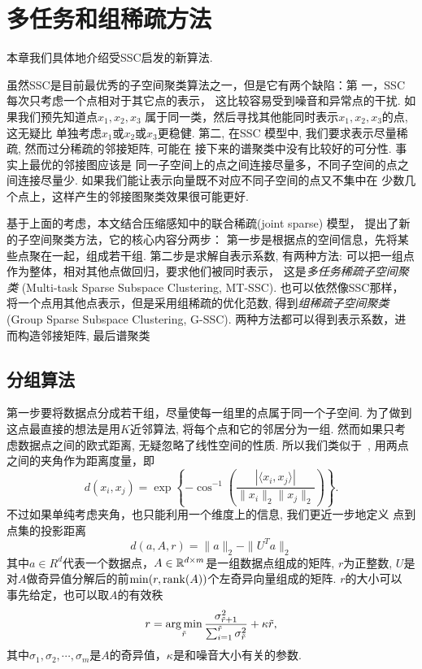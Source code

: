 \chapter{多任务和组稀疏方法}\label{chp:prob_setup}
本章我们具体地介绍受SSC启发的新算法.

虽然SSC是目前最优秀的子空间聚类算法之一，但是它有两个缺陷：第
一，SSC 每次只考虑一个点相对于其它点的表示，
这比较容易受到噪音和异常点的干扰. 如果我们预先知道点\(x_1, x_2, x_3\)
属于同一类，然后寻找其他能同时表示\(x_1, x_2, x_3\)的点, 这无疑比
单独考虑\(x_1\)或\(x_2\)或\(x_3\)更稳健. 第二, 在SSC 模型中,
我们要求表示尽量稀疏, 然而过分稀疏的邻接矩阵, 可能在
接下来的谱聚类中没有比较好的可分性. 事实上最优的邻接图应该是
同一子空间上的点之间连接尽量多，不同子空间的点之间连接尽量少.
如果我们能让表示向量既不对应不同子空间的点又不集中在
少数几个点上，这样产生的邻接图聚类效果很可能更好.

基于上面的考虑，本文结合压缩感知中的联合稀疏(joint sparse) 模型\cite{yuan2012visual}，
提出了新的子空间聚类方法，它的核心内容分两步：
第一步是根据点的空间信息，先将某些点聚在一起，组成若干组.
第二步是求解自表示系数, 有两种方法:
可以把一组点作为整体，相对其他点做回归，要求他们被同时表示，
这是\emph{多任务稀疏子空间聚类}
(Multi-task Sparse Subspace Clustering, MT-SSC). 也可以依然像SSC那样，
将一个点用其他点表示，但是采用组稀疏的优化范数,
得到\emph{组稀疏子空间聚类}(Group Sparse Subspace Clustering, G-SSC).
两种方法都可以得到表示系数，进而构造邻接矩阵, 最后谱聚类

\section{分组算法} 
第一步要将数据点分成若干组，尽量使每一组里的点属于同一个子空间.
为了做到这点最直接的想法是用\(K\)近邻算法, 将每个点和它的邻居分为一组.
然而如果只考虑数据点之间的欧式距离, 无疑忽略了线性空间的性质.
所以我们类似于~\cite{heckel2013noisy}, 用两点之间的夹角作为距离度量，即
\[d(x_i,x_j)=\exp\left\{-\cos^{-1}\left( \frac{|\langle x_i,
x_j\rangle|}{\|x_i\|_2\|x_j\|_2} \right)\right\}.\]
不过如果单纯考虑夹角，也只能利用一个维度上的信息, 我们更近一步地定义
点到点集的投影距离
\[ d(a, A, r) =  \|a\|_2-\|U^Ta\|_2 \]
其中\(a \in R^d\)代表一个数据点，\(A\in \mathbb{R}^{d\times m}\)是一组数据点组成的矩阵,
\(r\)为正整数, \(U\)是对\(A\)做奇异值分解后的前\(\min(r, \operatorname{rank}(A))\)个左奇异向量组成的矩阵.
\(r\)的大小可以
事先给定，也可以取\(A\)的有效秩\cite{yan2006general}
\[
  r = \operatorname*{arg\,min}_{\tilde{r}} \frac{\sigma_{\tilde{r}+1}^2}{\sum_{i=1}^{\tilde{r}}
  \sigma_{\tilde{r}}^2} +\kappa \tilde{r},
\]
其中\(\sigma_1,\sigma_2,\cdots,\sigma_m\)是\(A\)的奇异值，\(\kappa\)是和噪音大小有关的参数.

